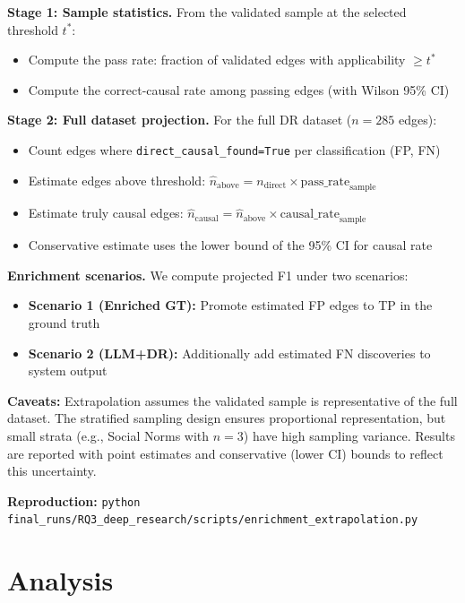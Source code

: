 \textbf{Stage 1: Sample statistics.} From the validated sample at the selected threshold $t^*$:
\begin{itemize}[noitemsep]
    \item Compute the pass rate: fraction of validated edges with applicability $\geq t^*$
    \item Compute the correct-causal rate among passing edges (with Wilson 95\% CI)
\end{itemize}

\textbf{Stage 2: Full dataset projection.} For the full DR dataset ($n=285$ edges):
\begin{itemize}[noitemsep]
    \item Count edges where \texttt{direct\_causal\_found=True} per classification (FP, FN)
    \item Estimate edges above threshold: $\hat{n}_{\text{above}} = n_{\text{direct}} \times \text{pass\_rate}_{\text{sample}}$
    \item Estimate truly causal edges: $\hat{n}_{\text{causal}} = \hat{n}_{\text{above}} \times \text{causal\_rate}_{\text{sample}}$
    \item Conservative estimate uses the lower bound of the 95\% CI for causal rate
\end{itemize}

\textbf{Enrichment scenarios.} We compute projected F1 under two scenarios:
\begin{itemize}[noitemsep]
    \item \textbf{Scenario 1 (Enriched GT):} Promote estimated FP edges to TP in the ground truth
    \item \textbf{Scenario 2 (LLM+DR):} Additionally add estimated FN discoveries to system output
\end{itemize}

\textbf{Caveats:} Extrapolation assumes the validated sample is representative of the full dataset. The stratified sampling design ensures proportional representation, but small strata (e.g., Social Norms with $n=3$) have high sampling variance. Results are reported with point estimates and conservative (lower CI) bounds to reflect this uncertainty.

\textbf{Reproduction:} \texttt{python final\_runs/RQ3\_deep\_research/scripts/enrichment\_extrapolation.py}

\section{Analysis}

